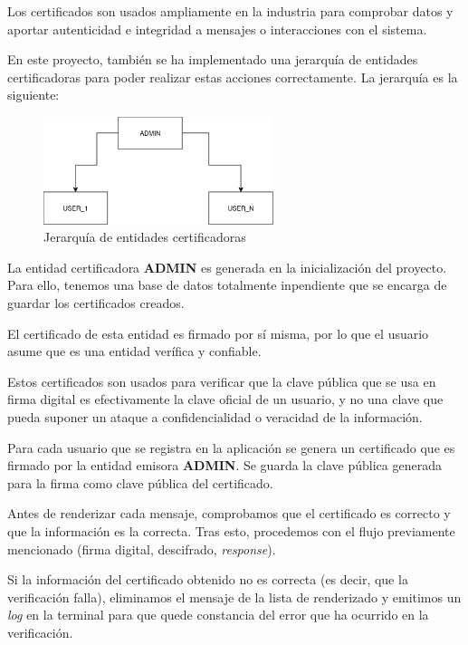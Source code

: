 \documentclass[a4paper,11pt]{article}
\begin{document}
Los certificados son usados ampliamente en la industria para comprobar datos y aportar autenticidad e integridad a mensajes o interacciones con el sistema.

En este proyecto, también se ha implementado una jerarquía de entidades certificadoras para poder realizar estas acciones correctamente. La jerarquía es la siguiente:

\begin{figure}[h]
    \centering
    \includegraphics[width=0.6\textwidth]{./images/certificatesStructure.png}
    \caption{Jerarquía de entidades certificadoras}
    \label{fig:jerarquia}
\end{figure}

La entidad certificadora \textbf{ADMIN} es generada en la inicialización del proyecto. Para ello, tenemos una base de datos totalmente inpendiente que se encarga de guardar los certificados creados.

El certificado de esta entidad es firmado por sí misma, por lo que el usuario asume que es una entidad verífica y confiable.

Estos certificados son usados para verificar que la clave pública que se usa en firma digital es efectivamente la clave oficial de un usuario, y no una clave que pueda suponer un ataque a confidencialidad o veracidad de la información.

Para cada usuario que se registra en la aplicación se genera un certificado que es firmado por la entidad emisora \textbf{ADMIN}. Se guarda la clave pública generada para la firma como clave pública del certificado.

Antes de renderizar cada mensaje, comprobamos que el certificado es correcto y que la información es la correcta. Tras esto, procedemos con el flujo previamente mencionado (firma digital, descifrado, \textit{response}). 

Si la información del certificado obtenido no es correcta (es decir, que la verificación falla), eliminamos el mensaje de la lista de renderizado y emitimos un \textit{log} en la terminal para que quede constancia del error que ha ocurrido en la verificación.
\end{document}

